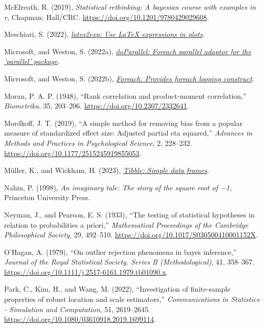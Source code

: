 \documentclass[
  10pt,
  a4paper,
  twoside]{article}
\newlength{\cslhangindent}
\newenvironment{CSLReferences}[2] %
 {\begin{list}{}{%
  \setlength{\itemindent}{0pt}
  \setlength{\leftmargin}{0pt}
  \setlength{\parsep}{0pt}
  \ifodd #1
   \setlength{\leftmargin}{\cslhangindent}
   \setlength{\itemindent}{-1\cslhangindent}
  \fi
  \setlength{\itemsep}{#2\baselineskip}}}
 {\end{list}}
\begin{document}
\begin{CSLReferences}{1}{0}
McElreath, R. (2019), \emph{Statistical rethinking: A bayesian course with examples in r}, Chapman; Hall/CRC. \url{https://doi.org/10.1201/9780429029608}.

Meschiari, S. (2022), \emph{\href{https://CRAN.R-project.org/package=latex2exp}{latex2exp: Use LaTeX expressions in plots}}.

Microsoft, and Weston, S. (2022a), \emph{\href{https://CRAN.R-project.org/package=doParallel}{doParallel: Foreach parallel adaptor for the 'parallel' package}}.

Microsoft, and Weston, S. (2022b), \emph{\href{https://CRAN.R-project.org/package=foreach}{Foreach: Provides foreach looping construct}}.

Moran, P. A. P. (1948), {``Rank correlation and product-moment correlation,''} \emph{Biometrika}, 35, 203--206. \url{https://doi.org/10.2307/2332641}.

Mordkoff, J. T. (2019), {``A simple method for removing bias from a popular measure of standardized effect size: Adjusted partial eta squared,''} \emph{Advances in Methods and Practices in Psychological Science}, 2, 228--232. \url{https://doi.org/10.1177/2515245919855053}.

Müller, K., and Wickham, H. (2023), \emph{\href{https://CRAN.R-project.org/package=tibble}{Tibble: Simple data frames}}.

Nahin, P. (1998), \emph{An imaginary tale: The story of the square root of −1}, Princeton University Press.

Neyman, J., and Pearson, E. S. (1933), {``The testing of statistical hypotheses in relation to probabilities a priori,''} \emph{Mathematical Proceedings of the Cambridge Philosophical Society}, 29, 492--510. \url{https://doi.org/10.1017/S030500410001152X}.

O'Hagan, A. (1979), {``On outlier rejection phenomena in bayes inference,''} \emph{Journal of the Royal Statistical Society. Series B (Methodological)}, 41, 358--367. \url{https://doi.org/10.1111/j.2517-6161.1979.tb01090.x}.

Park, C., Kim, H., and Wang, M. (2022), {``Investigation of finite-sample properties of robust location and scale estimators,''} \emph{Communications in Statistics - Simulation and Computation}, 51, 2619--2645. \url{https://doi.org/10.1080/03610918.2019.1699114}.


\end{CSLReferences}
\end{document}
